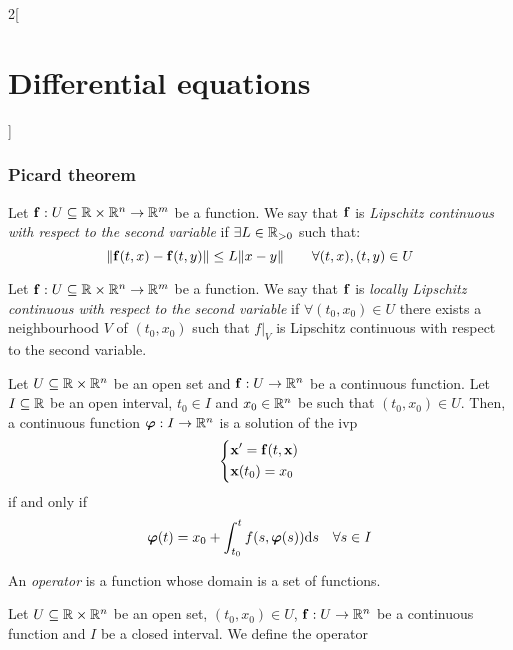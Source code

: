 \documentclass[../../../main.tex]{subfiles}
\begin{document}
\begin{multicols}{2}[\section{Differential equations}]
  \subsubsection{Picard theorem}
  \begin{definition}
    Let $\boldsymbol{\mathrm{f}}:U\subseteq\mathbb{R}\times\mathbb{R}^n\rightarrow\mathbb{R}^m$ be a function. We say that $\boldsymbol{\mathrm{f}}$ is \textit{Lipschitz continuous with respect to the second variable} if $\exists L\in\mathbb{R}_{>0}$ such that: $$\|\boldsymbol{\mathrm{f}}(t,x)-\boldsymbol{\mathrm{f}}(t,y)\|\leq L\|x-y\|\qquad\forall (t,x),(t,y)\in U$$
  \end{definition}
  \begin{definition}
    Let $\boldsymbol{\mathrm{f}}:U\subseteq\mathbb{R}\times\mathbb{R}^n\rightarrow\mathbb{R}^m$ be a function. We say that $\boldsymbol{\mathrm{f}}$ is \textit{locally Lipschitz continuous with respect to the second variable} if $\forall (t_0,x_0)\in U$ there exists a neighbourhood $V$ of $(t_0,x_0)$ such that $f|_V$ is Lipschitz continuous with respect to the second variable.
  \end{definition}
  \begin{prop}
    Let $U\subseteq\mathbb{R}\times\mathbb{R}^n$ be an open set and $\boldsymbol{\mathrm{f}}:U\rightarrow\mathbb{R}^n$ be a continuous function. Let $I\subseteq\mathbb{R}$ be an open interval, $t_0\in I$ and $x_0\in\mathbb{R}^n$ be such that $(t_0,x_0)\in U$. Then, a continuous function $\boldsymbol{\mathrm{\varphi}}:I\rightarrow\mathbb{R}^n$ is a solution of the ivp
    \begin{equation}
      \left\{
      \begin{aligned}
         & \boldsymbol{\mathrm{x}}'=\boldsymbol{\mathrm{f}}(t,\boldsymbol{\mathrm{x}}) \\
         & \boldsymbol{\mathrm{x}}(t_0)=x_0
      \end{aligned}
      \right.
      \label{DE_ivp}
    \end{equation}
    if and only if $$\boldsymbol{\mathrm{\varphi}}(t)=x_0+\int_{t_0}^tf(s,\boldsymbol{\mathrm{\varphi}}(s))\dd s\quad\forall s\in I$$
  \end{prop}
  \begin{definition}
    An \textit{operator} is a function whose domain is a set of functions.
  \end{definition}
  \begin{definition}
    Let $U\subseteq\mathbb{R}\times\mathbb{R}^n$ be an open set, $(t_0,x_0)\in U$, $\boldsymbol{\mathrm{f}}:U\rightarrow\mathbb{R}^n$ be a continuous function and $I$ be a closed interval. We define the operator
    \begin{align*}

\end{align*}
\end{definition}
\end{multicols}
\end{document}
